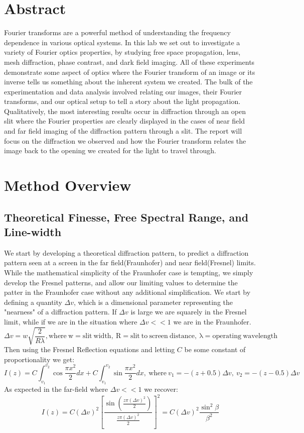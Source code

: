 \documentclass[11pt]{article}
\begin{document}
\section{Abstract}
Fourier transforms are a powerful method of understanding the frequency dependence in various optical systems. In this lab we set out to investigate a variety of Fourier optics properties, by studying free space propagation, lens, mesh diffraction, phase contrast, and dark field imaging. All of these experiments demonstrate some aspect of optics where the Fourier transform of an image or its inverse tells us something about the inherent system we created. The bulk of the experimentation and data analysis involved relating our images, their Fourier transforms, and our optical setup to tell a story about the light propagation. Qualitatively, the most interesting results occur in diffraction through an open slit where the Fourier properties are clearly displayed in the cases of near field and far field imaging of the diffraction pattern through a slit. The report will focus on the diffraction we observed and how the Fourier transform relates the image back to the opening we created for the light to travel through. 
\section{Method Overview}
\subsection{Theoretical Finesse, Free Spectral Range, and Line-width}
We start by developing a theoretical diffraction pattern, to predict a diffraction pattern seen at a screen in the far field(Fraunhofer) and near field(Fresnel) limits.   While the mathematical simplicity of the Fraunhofer case is tempting, we simply develop the Fresnel patterns, and allow our limiting values to determine the patter in the Fraunhofer case without any additional simplification. 
We start by defining a quantity $\Delta v$, which is a dimensional parameter representing the "nearness" of a diffraction pattern. If $\Delta v$ is large we are squarely in the Fresnel limit, while if we are in the situation where $\Delta v << 1$ we are in the Fraunhofer.
$$\Delta v = w \sqrt{\frac{2}{R\lambda}}, \mathrm{where\ w = slit\ width,\ R = slit\ to\ screen\ distance,\ \lambda = operating\ wavelength} $$
Then using the Fresnel Reflection equations and letting $C$ be some constant of proportionality we get:
$$ I(z) = C \int_{v_{1}}^{v_{2}}\cos{\frac{\pi x^2}{2}} dx + C\int_{v_{1}}^{v_{2}}\sin{\frac{\pi x^2}{2}} dx, \mathrm{\ where\ } v_1 = -(z+0.5)\Delta v, \ v_2 = -(z-0.5)\Delta v $$
As expected in the far-field where $\Delta v << 1$ we recover:
$$ I(z) = C (\Delta v)^2 [\frac{\sin(\frac{z\pi (\Delta v)^2}{2})}{\frac{z\pi (\Delta v)^2}{2}}]^2 = C (\Delta v)^2 \frac{\sin^2{\beta}}{\beta^2}$$
\vspace{-9mm} 
\end{document}
